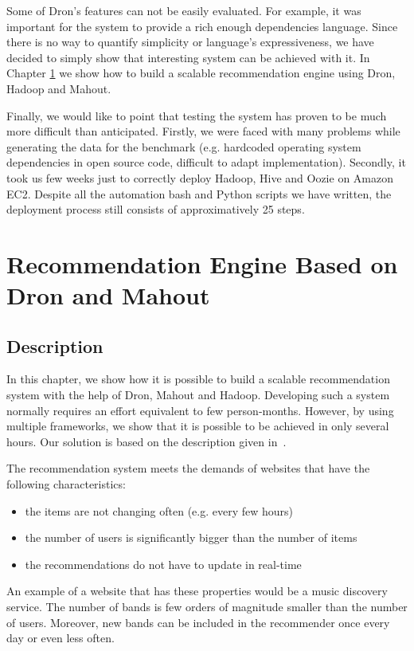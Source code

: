 \documentclass[11pt,a4paper,twoside]{report}
\begin{document}
Some of Dron's features can not be easily evaluated. For example, it was important for the system to provide a rich enough dependencies language. Since there is no way to quantify simplicity or language's expressiveness, we have decided to simply show that interesting system can be achieved with it. In Chapter \ref{chap:Recommendation} we show how to build a scalable recommendation engine using Dron, Hadoop and Mahout.


Finally, we would like to point that testing the system has proven to be much more difficult than anticipated. Firstly, we were faced with many problems while generating the data for the benchmark (e.g. hardcoded operating system dependencies in open source code, difficult to adapt implementation). Secondly, it took us few weeks just to correctly deploy Hadoop, Hive and Oozie on Amazon EC2. Despite all the automation bash and Python scripts we have written, the deployment process still consists of approximatively 25 steps.


\chapter{Recommendation Engine Based on Dron and Mahout}
\label{chap:Recommendation}

\section{Description}
In this chapter, we show how it is possible to build a scalable recommendation system with the help of Dron, Mahout and Hadoop. Developing such a system normally requires an effort equivalent to few person-months. However, by using multiple frameworks, we show that it is possible to be achieved in only several hours. Our solution is based on the description given in~\cite{RecommenderSystem}.

The recommendation system meets the demands of websites that have the following characteristics:

\begin{itemize}
\item{the items are not changing often (e.g. every few hours)}
\item{the number of users is significantly bigger than the number of items}
\item{the recommendations do not have to update in real-time}
\end{itemize}


An example of a website that has these properties would be a music discovery service. The number of bands is few orders of magnitude smaller than the number of users. Moreover, new bands can be included in the recommender once every day or even less often.
\end{document}

